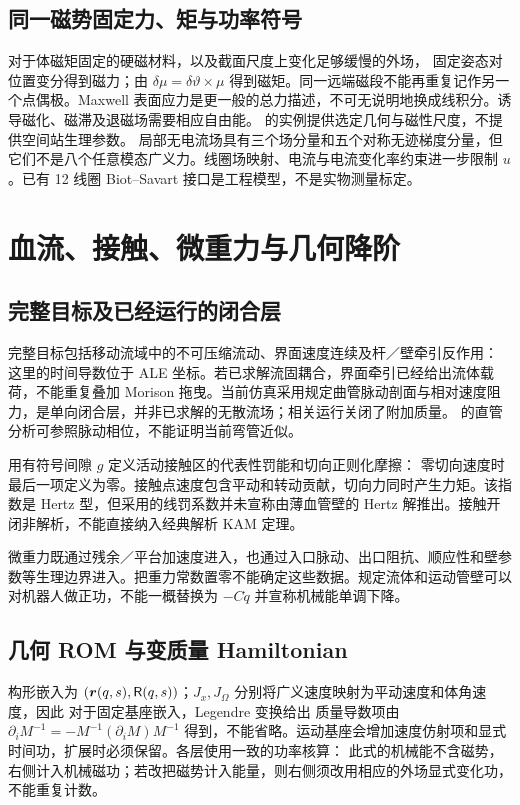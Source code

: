 \subsection{同一磁势固定力、矩与功率符号}
对于体磁矩固定的硬磁材料，以及截面尺度上变化足够缓慢的外场，
\EqMagneticEnergy
固定姿态对位置变分得到磁力；由 $\delta\mu=\delta\vartheta\times\mu$ 得到磁矩。同一远端磁段不能再重复记作另一个点偶极。Maxwell 表面应力是更一般的总力描述，不可无说明地换成线积分。诱导磁化、磁滞及退磁场需要相应自由能。\citet{tong2025} 的实例提供选定几何与磁性尺度，不提供空间站生理参数。
\EqMagneticPort
局部无电流场具有三个场分量和五个对称无迹梯度分量，但它们不是八个任意模态广义力。线圈场映射、电流与电流变化率约束进一步限制 $u$。已有 12 线圈 Biot--Savart 接口是工程模型，不是实物测量标定。

\PaperPage
\section{血流、接触、微重力与几何降阶}
\subsection{完整目标及已经运行的闭合层}
完整目标包括移动流域中的不可压缩流动、界面速度连续及杆／壁牵引反作用：
\EqFluid
这里的时间导数位于 ALE 坐标。若已求解流固耦合，界面牵引已经给出流体载荷，不能重复叠加 Morison 拖曳。当前仿真采用规定曲管脉动剖面与相对速度阻力，是单向闭合层，并非已求解的无散流场；相关运行关闭了附加质量。\citet{womersley1955} 的直管分析可参照脉动相位，不能证明当前弯管近似。

用有符号间隙 $g$ 定义活动接触区的代表性罚能和切向正则化摩擦：
\EqContact
零切向速度时最后一项定义为零。接触点速度包含平动和转动贡献，切向力同时产生力矩。该指数是 Hertz 型，但采用的线罚系数并未宣称由薄血管壁的 Hertz 解推出。接触开闭非解析，不能直接纳入经典解析 KAM 定理。

微重力既通过残余／平台加速度进入，也通过入口脉动、出口阻抗、顺应性和壁参数等生理边界进入。把重力常数置零不能确定这些数据。规定流体和运动管壁可以对机器人做正功，不能一概替换为 $-C\dot q$ 并宣称机械能单调下降。

\subsection{几何 ROM 与变质量 Hamiltonian}
构形嵌入为 $(\bm r(q,s),\mathsf R(q,s))$；$J_x,J_\Omega$ 分别将广义速度映射为平动速度和体角速度，因此
\EqMass
对于固定基座嵌入，Legendre 变换给出
\EqHamiltonian
质量导数项由 $\partial_iM^{-1}=-M^{-1}(\partial_iM)M^{-1}$ 得到，不能省略。运动基座会增加速度仿射项和显式时间功，扩展时必须保留。各层使用一致的功率核算：
\EqPower
此式的机械能不含磁势，右侧计入机械磁功；若改把磁势计入能量，则右侧须改用相应的外场显式变化功，不能重复计数。

